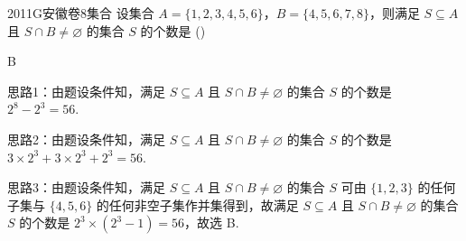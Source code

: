 
\begin{problem}{2011}{G}{安徽卷}{8}{集合}
设集合 $ A = \{1,2,3,4,5,6\} $，$ B = \{4,5,6,7,8\} $，则满足 $ S \subseteq A $ 且 $ S \cap B \neq \varnothing $ 的集合 $ S $ 的个数是 (\hspace{1cm})
\begin{choices}
\end{choices}
\end{problem}

\begin{answer}
B
\end{answer}

\begin{solutions}
思路1：由题设条件知，满足 $ S \subseteq A $ 且 $ S \cap B \neq \varnothing $ 的集合 $ S $ 的个数是 $ 2^8 - 2^3 = 56 $.

思路2：由题设条件知，满足 $ S \subseteq A $ 且 $ S \cap B \neq \varnothing $ 的集合 $ S $ 的个数是 $ 3 \times 2^3 + 3 \times 2^3 + 2^3 = 56 $.

思路3：由题设条件知，满足 $ S \subseteq A $ 且 $ S \cap B \neq \varnothing $ 的集合 $ S $ 可由 $ \{1,2,3\} $ 的任何子集与 $ \{4,5,6\} $ 的任何非空子集作并集得到，故满足 $ S \subseteq A $ 且 $ S \cap B \neq \varnothing $ 的集合 $ S $ 的个数是 $ 2^3 \times (2^3 - 1) = 56 $，故选 B.
\end{solutions}